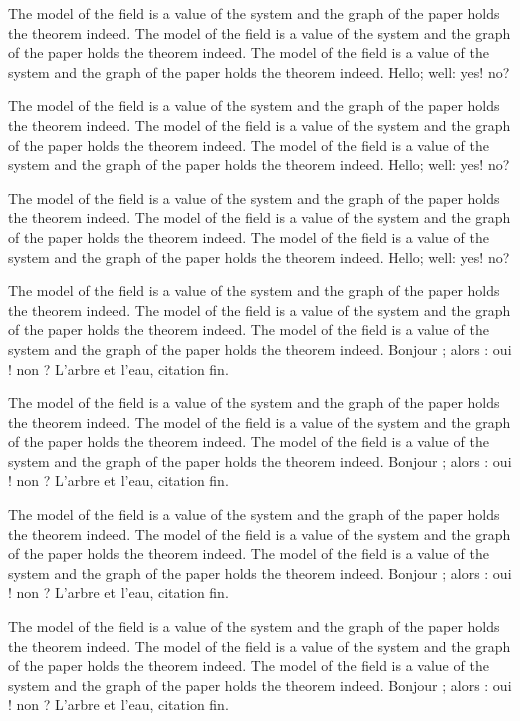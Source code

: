 \documentclass{article}
\begin{document}
The model of the field is a value of the system and the graph of the paper holds the theorem indeed. The model of the field is a value of the system and the graph of the paper holds the theorem indeed. The model of the field is a value of the system and the graph of the paper holds the theorem indeed. Hello; well: yes! no?

The model of the field is a value of the system and the graph of the paper holds the theorem indeed. The model of the field is a value of the system and the graph of the paper holds the theorem indeed. The model of the field is a value of the system and the graph of the paper holds the theorem indeed. Hello; well: yes! no?

The model of the field is a value of the system and the graph of the paper holds the theorem indeed. The model of the field is a value of the system and the graph of the paper holds the theorem indeed. The model of the field is a value of the system and the graph of the paper holds the theorem indeed. Hello; well: yes! no?


The model of the field is a value of the system and the graph of the paper holds the theorem indeed. The model of the field is a value of the system and the graph of the paper holds the theorem indeed. The model of the field is a value of the system and the graph of the paper holds the theorem indeed. Bonjour ; alors : oui ! non ? L'arbre et l'eau, \og citation \fg{} fin.

The model of the field is a value of the system and the graph of the paper holds the theorem indeed. The model of the field is a value of the system and the graph of the paper holds the theorem indeed. The model of the field is a value of the system and the graph of the paper holds the theorem indeed. Bonjour ; alors : oui ! non ? L'arbre et l'eau, \og citation \fg{} fin.

The model of the field is a value of the system and the graph of the paper holds the theorem indeed. The model of the field is a value of the system and the graph of the paper holds the theorem indeed. The model of the field is a value of the system and the graph of the paper holds the theorem indeed. Bonjour ; alors : oui ! non ? L'arbre et l'eau, \og citation \fg{} fin.

The model of the field is a value of the system and the graph of the paper holds the theorem indeed. The model of the field is a value of the system and the graph of the paper holds the theorem indeed. The model of the field is a value of the system and the graph of the paper holds the theorem indeed. Bonjour ; alors : oui ! non ? L'arbre et l'eau, \og citation \fg{} fin.
\end{document}

